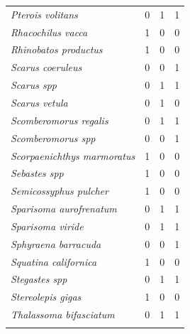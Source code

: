 \documentclass[10pt]{article}
\begin{document}
\begin{longtable}{>{\itshape}lrrr}
Pterois volitans & 0 & 1 & 1\\
Rhacochilus vacca & 1 & 0 & 0\\
Rhinobatos productus & 1 & 0 & 0\\
Scarus coeruleus & 0 & 0 & 1\\
\addlinespace
Scarus spp & 0 & 1 & 1\\
Scarus vetula & 0 & 1 & 0\\
Scomberomorus regalis & 0 & 1 & 1\\
Scomberomorus spp & 0 & 0 & 1\\
Scorpaenichthys marmoratus & 1 & 0 & 0\\
\addlinespace
Sebastes spp & 1 & 0 & 0\\
Semicossyphus pulcher & 1 & 0 & 0\\
Sparisoma aurofrenatum & 0 & 1 & 1\\
Sparisoma viride & 0 & 1 & 1\\
Sphyraena barracuda & 0 & 0 & 1\\
\addlinespace
Squatina californica & 1 & 0 & 0\\
Stegastes spp & 0 & 1 & 1\\
Stereolepis gigas & 1 & 0 & 0\\
Thalassoma bifasciatum & 0 & 1 & 1\\*
\end{longtable}
\end{document}

